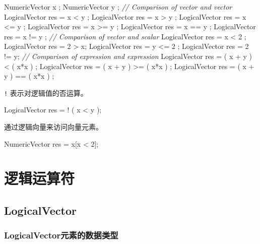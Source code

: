 \documentclass[]{ctexbook}
\newenvironment{Shaded}{\begin{snugshade}}{\end{snugshade}}
\newcommand{\DecValTok}[1]{\textcolor[rgb]{0.00,0.00,0.81}{#1}}
\newcommand{\CommentTok}[1]{\textcolor[rgb]{0.56,0.35,0.01}{\textit{#1}}}
\newcommand{\NormalTok}[1]{#1}
\begin{document}
\begin{Shaded}
\begin{Highlighting}[]
\NormalTok{NumericVector x ;}
\NormalTok{NumericVector y ;}
\CommentTok{// Comparison of vector and vector}
\NormalTok{LogicalVector res = x < y ;}
\NormalTok{LogicalVector res = x > y ;}
\NormalTok{LogicalVector res = x <= y ;}
\NormalTok{LogicalVector res = x >= y ;}
\NormalTok{LogicalVector res = x == y ;}
\NormalTok{LogicalVector res = x != y ;}
\CommentTok{// Comparison of vector and scalar}
\NormalTok{LogicalVector res = x < }\DecValTok{2}\NormalTok{ ;}
\NormalTok{LogicalVector res = }\DecValTok{2}\NormalTok{ > x;}
\NormalTok{LogicalVector res = y <= }\DecValTok{2}\NormalTok{ ;}
\NormalTok{LogicalVector res = }\DecValTok{2}\NormalTok{ != y;}
\CommentTok{// Comparison of expression and expression}
\NormalTok{LogicalVector res = ( x + y ) < ( x*x ) ;}
\NormalTok{LogicalVector res = ( x + y ) >= ( x*x ) ;}
\NormalTok{LogicalVector res = ( x + y ) == ( x*x ) ;}
\end{Highlighting}
\end{Shaded}

\texttt{!} 表示对逻辑值的否运算。

\begin{Shaded}
\begin{Highlighting}[]
\NormalTok{LogicalVector res = ! ( x < y );}
\end{Highlighting}
\end{Shaded}

通过逻辑向量来访问向量元素。

\begin{Shaded}
\begin{Highlighting}[]
\NormalTok{NumericVector res = x[x < }\DecValTok{2}\NormalTok{];}
\end{Highlighting}
\end{Shaded}

\chapter{逻辑运算符}\label{Logical-operations}

\section{LogicalVector}\label{LogicalVector}

\subsection{LogicalVector元素的数据类型}\label{LogicalVector-elements}
\end{document}
